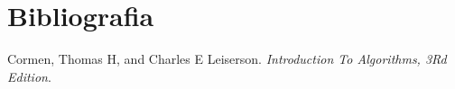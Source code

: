 \section{Bibliografia}

\begin{thebibliography}{1}
	Cormen, Thomas H, and Charles E Leiserson. \textit{Introduction To Algorithms, 3Rd Edition}. 
\end{thebibliography}

